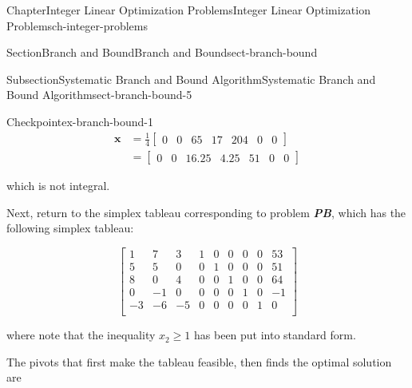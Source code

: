\documentclass[oneside,10pt,]{book}
\newcommand{\alert}[1]{\textbf{\textit{#1}}}
\numberwithin{equation}{section}
\newcommand{\amp}{&}
\begin{document}
\begin{chapterptx}{Chapter}{Integer Linear Optimization Problems}{}{Integer Linear Optimization Problems}{}{}{ch-integer-problems}
\begin{sectionptx}{Section}{Branch and Bound}{}{Branch and Bound}{}{}{sect-branch-bound}
\begin{subsectionptx}{Subsection}{Systematic Branch and Bound Algorithm}{}{Systematic Branch and Bound Algorithm}{}{}{sect-branch-bound-5}
\begin{inlineexercise}{Checkpoint}{}{ex-branch-bound-1}
\begin{equation*}
\begin{aligned} \boldsymbol{x} \amp = \frac{1}{4} \left[\begin{array}{rrr|rrrr} 0 \amp 0 \amp 65 \amp 17 \amp 204 \amp 0 \amp 0 \end{array}\right] \\ \amp = \left[\begin{array}{rrr|rrrr} 0 \amp 0 \amp 16.25 \amp 4.25 \amp 51 \amp 0 \amp 0 \end{array}\right] \end{aligned}
\end{equation*}
%
\par
which is not integral.%
\par
Next, return to the simplex tableau corresponding to problem \alert{PB}, which has the following simplex tableau:%
\par
%
\begin{equation*}
\left[\begin{array}{rrr|rrrrr|r} 1 \amp 7 \amp 3 \amp 1 \amp 0 \amp 0 \amp 0 \amp 0 \amp 53\\ 5 \amp 5 \amp 0 \amp 0 \amp 1 \amp 0 \amp 0 \amp 0 \amp 51\\ 8 \amp 0 \amp 4 \amp 0 \amp 0 \amp 1 \amp 0 \amp 0 \amp 64\\ 0 \amp -1 \amp 0 \amp 0 \amp 0 \amp 0 \amp 1 \amp 0 \amp -1\\ \hline -3 \amp -6 \amp -5 \amp 0 \amp 0 \amp 0 \amp 0 \amp 1 \amp 0\\ \end{array} \right]
\end{equation*}
%
\par
where note that the inequality \(x_2 \geq 1\) has been put into standard form.%
\par
The pivots that first make the tableau feasible, then finds the optimal solution are%
\par
%
\begin{equation*}

\end{equation*}
\end{inlineexercise}
\end{subsectionptx}
\end{sectionptx}
\end{chapterptx}
\end{document}
